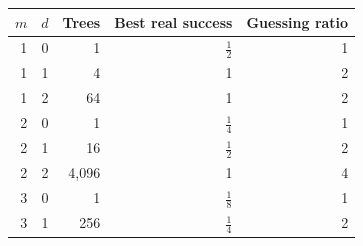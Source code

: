 \begin{tabular}{rrrrr}
\toprule
$m$ & $d$ & Trees & Best real success & Guessing ratio \\
\midrule
1 & 0 & 1 & $\frac{1}{2}$ & 1 \\
1 & 1 & 4 & 1 & 2 \\
1 & 2 & 64 & 1 & 2 \\
2 & 0 & 1 & $\frac{1}{4}$ & 1 \\
2 & 1 & 16 & $\frac{1}{2}$ & 2 \\
2 & 2 & 4,096 & 1 & 4 \\
3 & 0 & 1 & $\frac{1}{8}$ & 1 \\
3 & 1 & 256 & $\frac{1}{4}$ & 2 \\
\bottomrule
\end{tabular}
